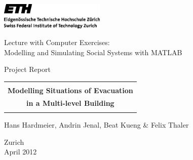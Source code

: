 
\thispagestyle{empty}

\begin{center}
\includegraphics[width=5cm]{ETHlogo.eps}

\bigskip


\bigskip


\bigskip


\LARGE{ 	Lecture with Computer Exercises:\\ }
\LARGE{ Modelling and Simulating Social Systems with MATLAB\\}

\bigskip

\bigskip

\small{Project Report}\\

\bigskip

\bigskip

\bigskip

\bigskip


\begin{tabular}{|c|}
\hline
\\
\textbf{\LARGE{Modelling Situations of Evacuation }}\\
\textbf{\LARGE{in a Multi-level Building}}\\
\\
\hline
\end{tabular}
\bigskip

\bigskip

\bigskip

\LARGE{Hans Hardmeier, Andrin Jenal, Beat Kueng \& Felix Thaler}



\bigskip

\bigskip

\bigskip

\bigskip

\bigskip

\bigskip

\bigskip

\bigskip

Zurich\\
April 2012\\

\end{center}


